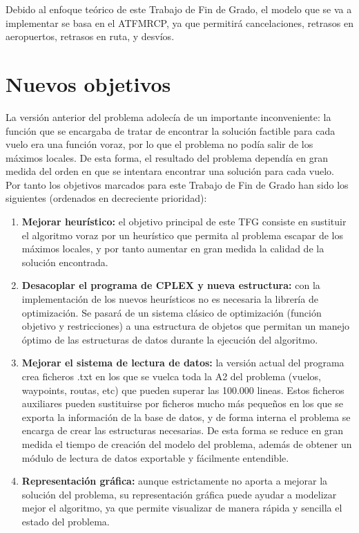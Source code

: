 Debido al enfoque teórico de este Trabajo de Fin de Grado, el modelo que se va a implementar se basa en el ATFMRCP, ya que permitirá cancelaciones, retrasos en aeropuertos, retrasos en ruta, y desvíos. 

\section{Nuevos objetivos}
La versión anterior del problema adolecía de un importante inconveniente: la función que se encargaba de tratar de encontrar la solución factible para cada vuelo era una función voraz, por lo que el problema no podía salir de los máximos locales. De esta forma, el resultado del problema dependía en gran medida del orden en que se intentara encontrar una solución para cada vuelo.\\

Por tanto los objetivos marcados para este Trabajo de Fin de Grado han sido los siguientes (ordenados en decreciente prioridad):
\begin{enumerate}
	\item \textbf{Mejorar heurístico: }el objetivo principal de este TFG consiste en sustituir el algoritmo voraz por un heurístico que permita al problema escapar de los máximos locales, y por tanto aumentar en gran medida la calidad de la solución encontrada.
	\item \textbf{Desacoplar el programa de CPLEX y nueva estructura: }con la implementación de los nuevos heurísticos no es necesaria la librería de optimización. Se pasará de un sistema clásico de optimización (función objetivo y restricciones) a una estructura de objetos que permitan un manejo óptimo de las estructuras de datos durante la ejecución del algoritmo.
	\item \textbf{Mejorar el sistema de lectura de datos: }la versión actual del programa crea ficheros .txt en los que se vuelca toda la A2 del problema (vuelos, waypoints, routas, etc) que pueden superar las 100.000 lineas. Estos ficheros auxiliares pueden sustituirse por ficheros mucho más pequeños en los que se exporta la información de la base de datos, y de forma interna el problema se encarga de crear las estructuras necesarias. De esta forma se reduce en gran medida el tiempo de creación del modelo del problema, además de obtener un módulo de lectura de datos exportable y fácilmente entendible.
	\item \textbf{Representación gráfica: }aunque estrictamente no aporta a mejorar la solución del problema, su representación gráfica puede ayudar a modelizar mejor el algoritmo, ya que permite visualizar de manera rápida y sencilla el estado del problema.
\end{enumerate}